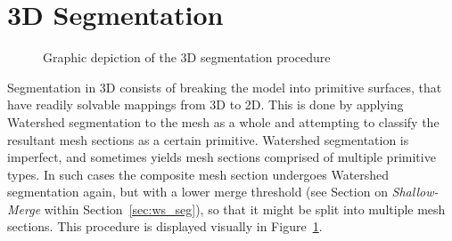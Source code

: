 \section{3D Segmentation}
\begin{figure}[H]
	\centering
{}
	\caption{Graphic depiction of the 3D segmentation procedure}
	\label{fig:Seg3D}
\end{figure}
Segmentation in 3D consists of breaking the model into primitive surfaces, that have readily solvable mappings from 3D to 2D.
This is done by applying Watershed segmentation to the mesh as a whole and attempting to classify the resultant mesh sections as a certain primitive.
Watershed segmentation is imperfect, and sometimes yields mesh sections comprised of multiple primitive types.
In such cases the composite mesh section undergoes Watershed segmentation again, but with a lower merge threshold (see Section on \textit{Shallow-Merge} within Section~\ref{sec:ws_seg}), so that it might be split into multiple mesh sections.
This procedure is displayed visually in Figure~\ref{fig:Seg3D}.


